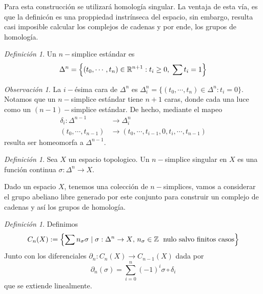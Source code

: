 \documentclass[aop]{imsart2}
\theoremstyle{plain}
\theoremstyle{remark}
\newtheorem{dfn}[teo]{Definición}
\newtheorem*{obs}{Observación}
\def \R {\mathbb{R}}
\def \Z {\mathbb{Z}}
\begin{document}
\vspace{1mm}
\noindent Para esta construcción se utilizará homología singular. La ventaja de esta vía, es que
la definicón es una proppiedad instrínseca del espacio, sin embargo, resulta casi imposible 
calcular los complejos de cadenas y por ende, los grupos de homología.

\begin{dfn}
    Un $n-$simplice estándar es
    \begin{equation*}
        \Delta^{n}=\left\{
            (t_{0},\cdots,t_{n})\in\R^{n+1}:t_{i}\geq0,\hspace{1mm}\sum t_{i}=1
        \right\}
    \end{equation*}
\end{dfn}

\begin{obs}
    La $i-$ésima cara de $\Delta^{n}$ es $\Delta^{n}_{i}
    =\{(t_{0},\cdots,t_{n})\in\Delta^{n}:t_{i}=0\}$. Notamos que un $n-$simplice estándar tiene
    $n+1$ caras, donde cada una luce como un $(n-1)-$simplice estándar. De hecho, mediante el 
    mapeo
    \begin{align*}
        \delta_{i}:\Delta^{n-1} &\to \Delta^{n}_{i} \\
        (t_{0},\cdots,t_{n-1}) &\to (t_{0},\cdots,t_{i-1},0,t_{i},\cdots,t_{n-1})
    \end{align*}
    resulta ser homeomorfa a $\Delta^{n-1}$.
\end{obs}

\begin{dfn}
    Sea $X$ un espacio topologico. Un $n-$simplice singular en $X$ es una función continua
    $\sigma:\Delta^{n}\to X$.
\end{dfn}

\noindent Dado un espacio $X$, tenemos una colección de $n-$simplices, vamos a considerar el grupo
abeliano libre generado por este conjunto para construir un complejo de cadenas y así los grupos
de homología.

\begin{dfn}
    Definimos
    \begin{equation*}
        C_{n}(X):=\left\{\sum n_{\sigma}\sigma\hspace{1mm}|\hspace{1mm}\sigma:\Delta^{n}\to X
        \text{, }n_{\sigma}\in\Z\hspace{1mm}
        \text{ nulo salvo finitos casos}\right\}
    \end{equation*}
    Junto con los diferenciales $\partial_{n}:C_{n}(X)\to C_{n-1}(X)$ dada por
    \begin{equation*}
        \partial_{n}(\sigma)=\sum_{i=0}^{n}(-1)^{i}\sigma\circ\delta_{i}
    \end{equation*}
    que se extiende linealmente.
\end{dfn}
\end{document}
